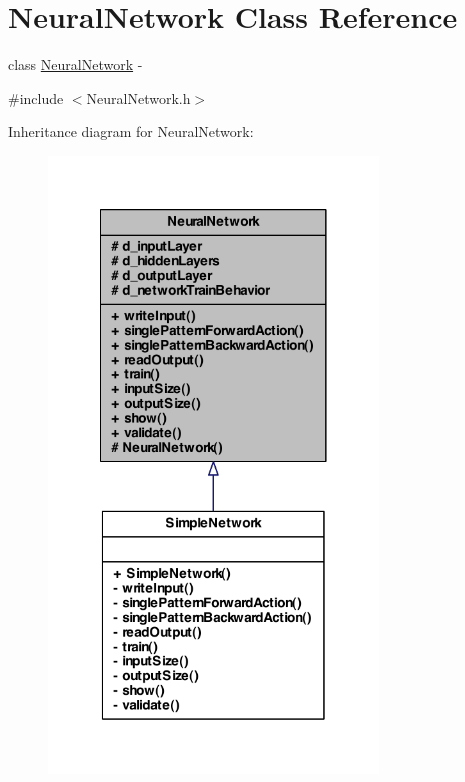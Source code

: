 \hypertarget{class_neural_network}{
\section{NeuralNetwork Class Reference}
\label{class_neural_network}
}


class \hyperlink{class_neural_network}{NeuralNetwork} -\/  




{\ttfamily \#include $<$NeuralNetwork.h$>$}



Inheritance diagram for NeuralNetwork:
\nopagebreak
\begin{figure}[H]
\begin{center}
\leavevmode
\includegraphics[width=248pt]{class_neural_network__inherit__graph}
\end{center}
\end{figure}
